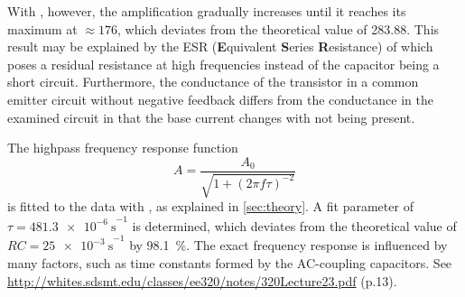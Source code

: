 With , however, the amplification gradually increases until it reaches its maximum at $\approx\num{176}$, which deviates from the theoretical value of \num{283.88}.
This result may be explained by the ESR (\textbf{E}quivalent \textbf{S}eries \textbf{R}esistance) of  which poses a residual resistance at high frequencies instead of the capacitor being a short circuit.
Furthermore, the conductance of the transistor in a common emitter circuit without negative feedback differs from the conductance in the examined circuit in that the base current changes with  not being present.

The highpass frequency response function
\begin{equation*}
	A=\frac{A_0}{\sqrt{1 + (2\pi f\tau)^{-2}}}
\end{equation*}
is fitted to the data with , as explained in \autoref{sec:theory}.
A fit parameter of $\tau=\SI{481.3e-6}{\second}^{-1}$ is determined, which deviates from the theoretical value of $RC=\SI{25e-3}{\second}^{-1}$ by \SI{98.1}{\percent}.
The exact frequency response is influenced by many factors, such as time constants formed by the AC-coupling capacitors.
See \url{http://whites.sdsmt.edu/classes/ee320/notes/320Lecture23.pdf} (p.13).
